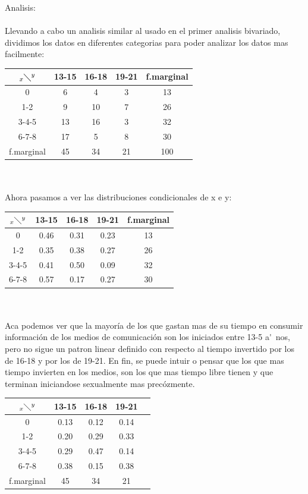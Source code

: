 \documentclass[letterpaper,spanish,11pt]{article}
\begin{document}
\begin{itemize}
\begin{enumerate}
\begin{enumerate}
Analisis:
\\\\
Llevando a cabo un analisis similar al usado en el primer analisis bivariado, dividimos los datos en diferentes categorias para poder analizar los datos mas facilmente:
        \begin{tabular}[c]{|c|c c c|c|}
        \hline
        $_x\diagdown ^{y}$ & 13-15 & 16-18 & 19-21 & f.marginal \\
        \hline
        0 & 6 & 4 & 3 & 13 \\
        1-2 & 9 & 10 & 7 & 26 \\
        3-4-5 & 13 & 16 & 3 & 32 \\
        6-7-8 & 17 & 5 & 8 & 30\\
	\hline
        f.marginal & 45 & 34 & 21 & 100 \\
        \hline
        \end{tabular}
\\\\
Ahora pasamos a ver las distribuciones condicionales de x e y:

         \begin{tabular}[c]{|c|c c c|c|}
        \hline
        $_x\diagdown ^{y}$ & 13-15 & 16-18 & 19-21 & f.marginal \\
        \hline
        0 & 0.46 & 0.31 & 0.23 & 13 \\
        1-2 & 0.35 & 0.38 & 0.27 & 26 \\
        3-4-5 & 0.41 & 0.50 & 0.09 & 32 \\
        6-7-8 & 0.57 & 0.17 & 0.27 & 30\\
        \hline
        \end{tabular}
\\\\
Aca podemos ver que la mayor\'ia de los que gastan mas de su tiempo en consumir informaci\'on de los medios de comunicaci\'on son los iniciados entre 13-5 a\'~nos, pero no sigue un patron linear definido con respecto al tiempo invertido por los de 16-18 y por los de 19-21. En fin, se puede intuir o pensar que los que mas tiempo invierten en los medios, son los que mas tiempo libre tienen y que terminan iniciandose sexualmente mas prec\'ozmente.\\

        \begin{tabular}[c]{|c|c c c|c|}
        \hline
        $_x\diagdown ^{y}$ & 13-15 & 16-18 & 19-21\\
        \hline
        0 & 0.13 & 0.12 & 0.14 \\
        1-2 & 0.20 & 0.29 & 0.33 \\
        3-4-5 & 0.29 & 0.47 & 0.14 \\
        6-7-8 & 0.38 & 0.15 & 0.38 \\
	\hline
        f.marginal & 45 & 34 & 21\\
        \hline
        \end{tabular}\\


\end{enumerate}
\end{enumerate}
\end{itemize}
\end{document}

